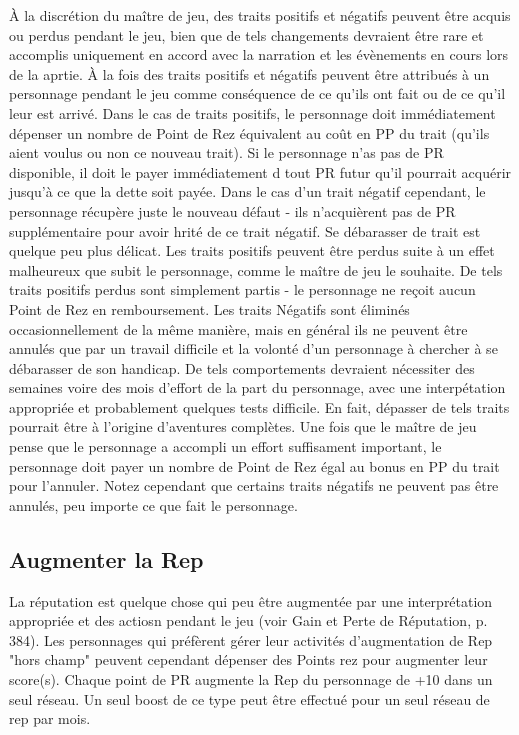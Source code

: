 À la discrétion du maître de jeu, des traits positifs et négatifs peuvent être acquis ou perdus pendant le jeu, bien que de tels changements devraient être rare et accomplis uniquement en accord avec la narration et les évènements en cours lors de la aprtie. À la fois des traits positifs et négatifs peuvent être attribués à un personnage pendant le jeu comme conséquence de ce qu'ils ont fait ou de ce qu'il leur est arrivé. Dans le cas de traits positifs, le personnage doit immédiatement dépenser un nombre de Point de Rez équivalent au coût en PP du trait (qu'ils aient voulus ou non ce nouveau trait). Si le personnage n'as pas de PR disponible, il doit le payer immédiatement d tout PR futur qu'il pourrait acquérir jusqu'à ce que la dette soit payée. Dans le cas d'un trait négatif cependant, le personnage récupère juste le nouveau défaut - ils n'acquièrent pas de PR supplémentaire pour avoir hrité de ce trait négatif. Se débarasser de trait est quelque peu plus délicat. Les traits positifs peuvent être perdus suite à un effet malheureux que subit le personnage, comme le maître de jeu le souhaite. De tels traits positifs perdus sont simplement partis - le personnage ne reçoit aucun Point de Rez en remboursement. Les traits Négatifs sont éliminés occasionnellement de la même manière, mais en général ils ne peuvent être annulés que par un travail difficile et la volonté d'un personnage à chercher à se débarasser de son handicap. De tels comportements devraient nécessiter des semaines voire des mois d'effort de la part du personnage, avec une interpétation appropriée et probablement quelques tests difficile. En fait, dépasser de tels traits pourrait être à l'origine d'aventures complètes. Une fois que le maître de jeu pense que le personnage a accompli un effort suffisament important, le personnage doit payer un nombre de Point de Rez égal au bonus en PP du trait pour l'annuler. Notez cependant que certains traits négatifs ne peuvent pas être annulés, peu importe ce que fait le personnage. 

\subsection{Augmenter la Rep} \label{sec:improving-rep} 

La réputation est quelque chose qui peu être augmentée par une interprétation appropriée et des actiosn pendant le jeu (voir Gain et Perte de Réputation, p. 384). Les personnages qui préfèrent gérer leur activités d'augmentation de Rep "hors champ" peuvent cependant dépenser des Points rez pour augmenter leur score(s). Chaque point de PR augmente la Rep du personnage de +10 dans un seul réseau. Un seul boost de ce type peut être effectué pour un seul réseau de rep par mois. 

